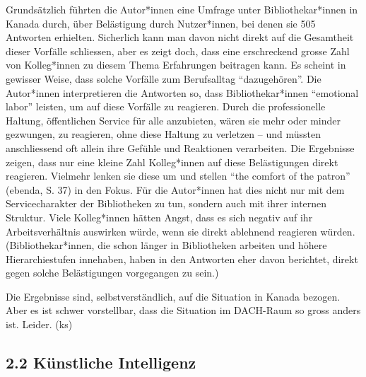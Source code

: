 \documentclass[a4paper,
fontsize=11pt,
oneside,
numbers=noperiodatend,
parskip=half-,
bibliography=totoc,
final
]{scrartcl}
\begin{document}
Grundsätzlich führten die Autor*innen eine Umfrage unter
Bibliothekar*innen in Kanada durch, über Belästigung durch Nutzer*innen,
bei denen sie 505 Antworten erhielten. Sicherlich kann man davon nicht
direkt auf die Gesamtheit dieser Vorfälle schliessen, aber es zeigt
doch, dass eine erschreckend grosse Zahl von Kolleg*innen zu diesem
Thema Erfahrungen beitragen kann. Es scheint in gewisser Weise, dass
solche Vorfälle zum Berufsalltag \enquote{dazugehören}. Die Autor*innen
interpretieren die Antworten so, dass Bibliothekar*innen
\enquote{emotional labor} leisten, um auf diese Vorfälle zu reagieren.
Durch die professionelle Haltung, öffentlichen Service für alle
anzubieten, wären sie mehr oder minder gezwungen, zu reagieren, ohne
diese Haltung zu verletzen -- und müssten anschliessend oft allein ihre
Gefühle und Reaktionen verarbeiten. Die Ergebnisse zeigen, dass nur eine
kleine Zahl Kolleg*innen auf diese Belästigungen direkt reagieren.
Vielmehr lenken sie diese um und stellen \enquote{the comfort of the
patron} (ebenda, S. 37) in den Fokus. Für die Autor*innen hat dies nicht
nur mit dem Servicecharakter der Bibliotheken zu tun, sondern auch mit
ihrer internen Struktur. Viele Kolleg*innen hätten Angst, dass es sich
negativ auf ihr Arbeitsverhältnis auswirken würde, wenn sie direkt
ablehnend reagieren würden. (Bibliothekar*innen, die schon länger in
Bibliotheken arbeiten und höhere Hierarchiestufen innehaben, haben in
den Antworten eher davon berichtet, direkt gegen solche Belästigungen
vorgegangen zu sein.)

Die Ergebnisse sind, selbstverständlich, auf die Situation in Kanada
bezogen. Aber es ist schwer vorstellbar, dass die Situation im DACH-Raum
so gross anders ist. Leider. (ks)

\hypertarget{kuxfcnstliche-intelligenz}{%
\subsection{2.2 Künstliche Intelligenz}\label{kuxfcnstliche-intelligenz}}
\end{document}
